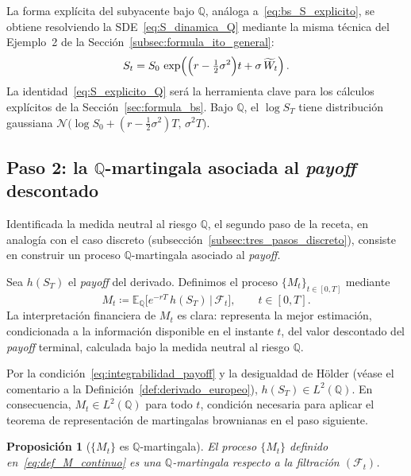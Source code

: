 \documentclass[11pt,a4paper,oneside]{report}
\theoremstyle{plain}
\newtheorem{proposicion}[teorema]{Proposición}
\theoremstyle{definition}
\theoremstyle{remark}
\newcommand{\E}{\mathbb{E}}
\newcommand{\Q}{\mathbb{Q}}
\newcommand{\F}{\mathcal{F}}
\newcommand{\1}{\mathbf{1}}
\newcommand{\eqdef}{\coloneqq}
\begin{document}
\noindent La forma explícita del subyacente bajo $\Q$, análoga
a~\eqref{eq:bs_S_explicito}, se obtiene resolviendo la
SDE~\eqref{eq:S_dinamica_Q} mediante la misma técnica del Ejemplo~2 de
la Sección~\ref{subsec:formula_ito_general}:
\begin{equation}\label{eq:S_explicito_Q}
  S_t = S_0\, \exp\!\left(\Bigl(r - \tfrac{1}{2}\sigma^2\Bigr) t
                          + \sigma\, \widetilde W_t\right).
\end{equation}
La identidad~\eqref{eq:S_explicito_Q} será la herramienta clave para los
cálculos explícitos de la Sección~\ref{sec:formula_bs}. Bajo $\Q$, el
$\log S_T$ tiene distribución gaussiana
$\mathcal{N}\bigl(\log S_0 + (r - \tfrac{1}{2}\sigma^2) T,\, \sigma^2
T\bigr)$.

\subsection{Paso 2: la $\Q$-martingala asociada al \emph{payoff} descontado}
\label{subsec:paso2_martingala}

Identificada la medida neutral al riesgo $\Q$, el segundo paso de la receta, en analogía con el caso discreto
(subsección~\ref{subsec:tres_pasos_discreto}), consiste en construir
un proceso $\Q$-martingala asociado al \emph{payoff}.

Sea $h(S_T)$ el \emph{payoff}
del derivado. Definimos el proceso $\{M_t\}_{t \in [0, T]}$ mediante
\begin{equation}\label{eq:def_M_continuo}
  M_t \eqdef \E_\Q\!\bigl[e^{-rT}\, h(S_T) \,\big|\, \F_t\bigr],
  \qquad t \in [0, T].
\end{equation}
La interpretación financiera de $M_t$ es clara: representa la mejor
estimación, condicionada a la información disponible en el instante
$t$, del valor descontado del \emph{payoff} terminal, calculada bajo
la medida neutral al riesgo $\Q$.

Por la condición~\eqref{eq:integrabilidad_payoff} y la desigualdad de Hölder (véase el comentario a la Definición~\ref{def:derivado_europeo}), $h(S_T) \in L^2(\Q)$.
En consecuencia, $M_t \in L^2(\Q)$ para todo $t$, condición necesaria
para aplicar el teorema de representación de martingalas brownianas
en el paso siguiente.

\begin{proposicion}[$\{M_t\}$ es $\Q$-martingala]
\label{prop:M_es_Q_martingala}
El proceso $\{M_t\}$ definido en~\eqref{eq:def_M_continuo} es una
$\Q$-martingala respecto a la filtración $(\F_t)$.
\end{proposicion}
\end{document}
